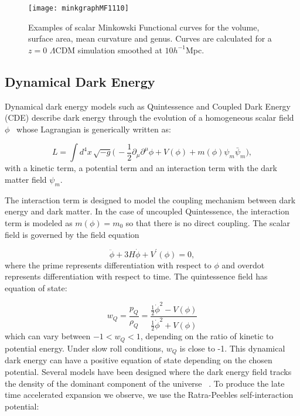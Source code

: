 \documentclass[a4paper,fleqn,usenatbib]{mnras}
\begin{document}
\begin{figure}
	\texttt{[image: minkgraphMF1110]}
    \caption{Examples of scalar Minkowski Functional curves for the volume, surface area, mean curvature and genus. Curves are calculated for a $z=0$ $\Lambda$CDM simulation smoothed at $10 h^{-1}$Mpc.}
    \label{fig:minkfunc}
\end{figure}


\subsection{Dynamical Dark Energy}
\label{sec:alt}

Dynamical dark energy models such as Quintessence and Coupled Dark Energy (CDE) describe dark energy through the evolution of a homogeneous scalar field $\phi$~\citep{2012IJMPD..2130002Y} whose Lagrangian is generically written as:

\begin{equation}
\label{Lagrangian}
L = \int d^4x \, \sqrt{ - g} \big( \, - \frac{1}{2} \partial_{\mu} \partial^{\mu} \phi +V(\phi)+m(\phi)\psi_m \bar{\psi}_m \big), 
\end{equation}
with a kinetic term, a potential term and an interaction term with the dark matter field $\psi_m$. 

The interaction term is designed to model the coupling mechanism between dark energy and dark matter. In the case of uncoupled Quintessence, the interaction term is modeled as $m(\phi) = m_0$ so that there is no direct coupling. The scalar field is governed by the field equation

\begin{equation}
\ddot{\phi} + 3H \dot{\phi} + V^{\prime}(\phi) = 0,
\end{equation}
where the prime represents differentiation with respect to $\phi$ and overdot represents differentiation with respect to time. The quintessence field has equation of state:

\begin{equation}
w_{Q} = \frac{p_Q}{\rho_Q} = \frac{\frac{1}{2} \dot{\phi}^2 - V(\phi)}{\frac{1}{2} \dot{\phi}^2 + V(\phi)}
\end{equation}
which can vary between $-1 < w_Q <  1$, depending on the ratio of kinetic to potential energy. Under slow roll conditions, $w_Q$ is close to -1. This dynamical dark energy can have a positive equation of state depending on the chosen potential. Several models have been designed where the dark energy field tracks the density of the dominant component of the universe~\citep{2012IJMPD..2130002Y} . To produce the late time accelerated expansion we observe, we use the Ratra-Peebles \citeyearpar{1988PhRvD..37.3406R} self-interaction potential:
\end{document}
